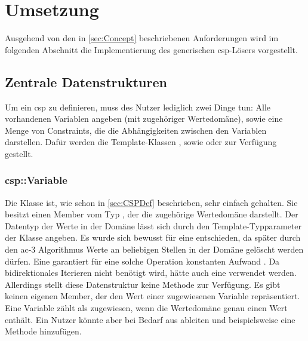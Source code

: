 \section{Umsetzung}
Ausgehend von den in \cref{sec:Concept} beschriebenen Anforderungen wird im folgenden Abschnitt die Implementierung des generischen \ac*{csp}-Lösers vorgestellt.

\subsection{Zentrale Datenstrukturen}
Um ein \ac*{csp} zu definieren, muss des Nutzer lediglich zwei Dinge tun: Alle vorhandenen Variablen angeben (mit zugehöriger Wertedomäne), sowie eine Menge von Constraints, die
die Abhängigkeiten zwischen den Variablen darstellen. Dafür werden die Template-Klassen , sowie  oder  zur
Verfügung gestellt.

\subsubsection{csp::Variable}
Die Klasse  ist, wie schon in \cref{sec:CSPDef} beschrieben, sehr einfach gehalten. Sie besitzt einen Member vom Typ , der die zugehörige
Wertedomäne darstellt. Der Datentyp der Werte in der Domäne lässt sich durch den Template-Typparameter der Klasse angeben. Es wurde sich bewusst für eine 
entschieden, da später durch den \ac*{ac}-3 Algorithmus Werte an beliebigen Stellen in der Domäne gelöscht werden dürfen. Eine  garantiert für eine solche
Operation konstanten Aufwand \cite{stdList}. Da bidirektionales Iterieren nicht benötigt wird, hätte auch eine  verwendet werden. Allerdings stellt
diese Datenstruktur keine Methode  zur Verfügung. Es gibt keinen eigenen Member, der den Wert einer zugewiesenen Variable repräsentiert. Eine Variable zählt als
zugewiesen, wenn die Wertedomäne genau einen Wert enthält. Ein Nutzer könnte aber bei Bedarf aus  ableiten und beispielsweise eine Methode 
hinzufügen.

